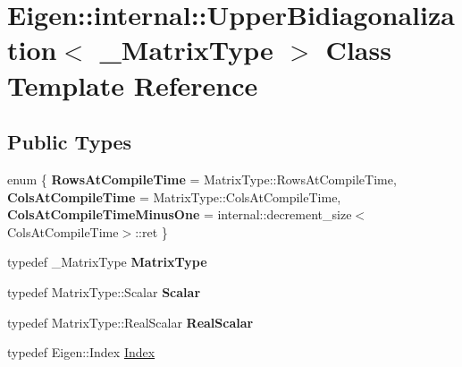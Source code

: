 \hypertarget{class_eigen_1_1internal_1_1_upper_bidiagonalization}{}\section{Eigen\+::internal\+::Upper\+Bidiagonalization$<$ \+\_\+\+Matrix\+Type $>$ Class Template Reference}
\label{class_eigen_1_1internal_1_1_upper_bidiagonalization}
\subsection*{Public Types}
\begin{DoxyCompactItemize}
\item 
\mbox{\label{class_eigen_1_1internal_1_1_upper_bidiagonalization_aaf1cc759ed17627d26c7484de3f43301}} 
enum \{ {\bfseries Rows\+At\+Compile\+Time} = Matrix\+Type\+::Rows\+At\+Compile\+Time, 
{\bfseries Cols\+At\+Compile\+Time} = Matrix\+Type\+::Cols\+At\+Compile\+Time, 
{\bfseries Cols\+At\+Compile\+Time\+Minus\+One} = internal\+::decrement\+\_\+size$<$Cols\+At\+Compile\+Time$>$\+::ret
 \}
\item 
\mbox{\label{class_eigen_1_1internal_1_1_upper_bidiagonalization_a9f1c62710b34e7076b8f118f90121a80}} 
typedef \+\_\+\+Matrix\+Type {\bfseries Matrix\+Type}
\item 
\mbox{\label{class_eigen_1_1internal_1_1_upper_bidiagonalization_aea9ea6ba33f6f6e24d70beab63d88cba}} 
typedef Matrix\+Type\+::\+Scalar {\bfseries Scalar}
\item 
\mbox{\label{class_eigen_1_1internal_1_1_upper_bidiagonalization_a7ecad0d6eda591982bdb84fd96553fec}} 
typedef Matrix\+Type\+::\+Real\+Scalar {\bfseries Real\+Scalar}
\item 
typedef Eigen\+::\+Index \mbox{\hyperlink{class_eigen_1_1internal_1_1_upper_bidiagonalization_adcb14f3919a3dcc9977ba6b8105087fe}{Index}}
\item 
\mbox{\label{class_eigen_1_1internal_1_1_upper_bidiagonalization_a43c537195ce8336a04e30246baf6860e}} 

\end{DoxyCompactItemize}
